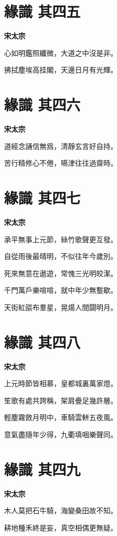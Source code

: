 \documentclass[12pt,a4paper]{ctexbook}
\begin{document}
\section{緣識  其四五}
\textbf{宋太宗}\par\vspace{0.5em}
心如明鑑照纖微，大道之中沒是非。\par
拂拭塵埃高挂閣，天邊日月有光輝。\par

\section{緣識  其四六}
\textbf{宋太宗}\par\vspace{0.5em}
道經念誦信無爲，清靜玄言好自持。\par
苦行精修心不倦，嚥津往往過齋時。\par

\section{緣識  其四七}
\textbf{宋太宗}\par\vspace{0.5em}
承平無事上元節，絲竹歌聲更互發。\par
自從雨後最晴明，不似往年今歲別。\par
死來無意在遨遊，常愧三光明皎潔。\par
千門萬戶樂喧喧，就中年少無蹔歇。\par
天街紅燄布羣星，晃煬人間闘明月。\par

\section{緣識  其四八}
\textbf{宋太宗}\par\vspace{0.5em}
上元時節皆相慕，皇都城裏萬家燈。\par
笙歌有處共誇稱，架肩疊足幾許層。\par
輕塵霧斂月明中，車騎雲軿五夜風。\par
意氣盡隨年少得，九衢填咽樂聲同。\par

\section{緣識  其四九}
\textbf{宋太宗}\par\vspace{0.5em}
木人莫把石牛騎，海變桑田故不知。\par
耕地種禾終是妄，真空相偶更無疑。\par
\end{document}
